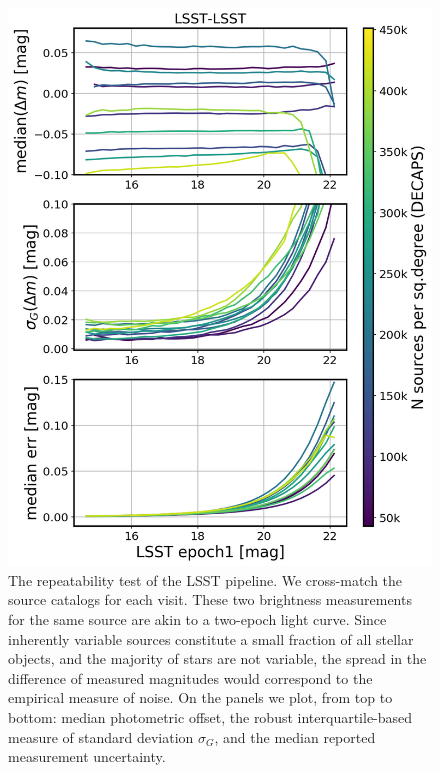 \documentclass[DM,lsstdraft,toc,usenatbib]{lsstdoc}
\begin{document}
\begin{figure}
\begin{centering}
\includegraphics[width=0.8\columnwidth]{figs/lsst-lsst_rms_plot.png}
\caption{The repeatability test of the LSST pipeline. We cross-match the source catalogs for each visit. These two brightness measurements for the same source are akin to a two-epoch light curve. Since inherently variable sources constitute a small fraction of all stellar objects, and the majority of stars are not variable, the spread in the difference of measured magnitudes would correspond to the empirical measure of noise. On the panels we plot, from top to bottom: median photometric offset, the robust interquartile-based measure of standard deviation $\sigma_{G}$, and the median reported measurement uncertainty.}
\label{fig:lsst_lsst_dmag}
\end{centering}
\end{figure} 
\end{document}
